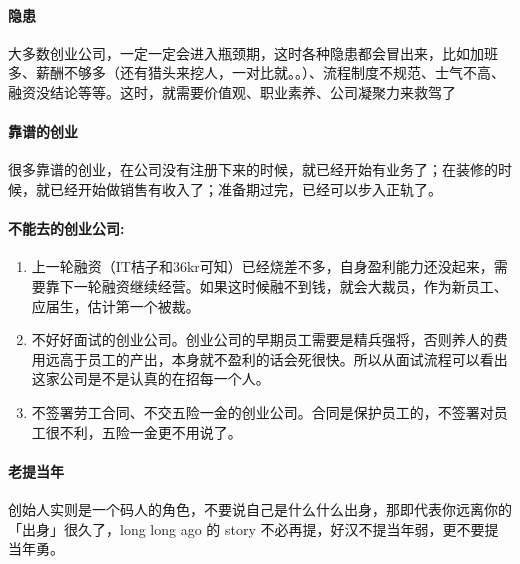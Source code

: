 \documentclass[letterpaper,11pt,english]{sphinxmanual}
\begin{document}
\paragraph{隐患}
\label{\detokenize{chapter_interview/not_go:id4}}
大多数创业公司，一定一定会进入瓶颈期，这时各种隐患都会冒出来，比如加班多、薪酬不够多（还有猎头来挖人，一对比就。。）、流程制度不规范、士气不高、融资没结论等等。这时，就需要价值观、职业素养、公司凝聚力来救驾了


\paragraph{靠谱的创业}
\label{\detokenize{chapter_interview/not_go:id5}}
很多靠谱的创业，在公司没有注册下来的时候，就已经开始有业务了；在装修的时候，就已经开始做销售有收入了；准备期过完，已经可以步入正轨了。
%
\begin{footnote}[811]\sphinxAtStartFootnote
{}
%
\end{footnote}


\paragraph{不能去的创业公司:}
\label{\detokenize{chapter_interview/not_go:id6}}\begin{enumerate}
%
\item {} 
上一轮融资（IT桔子和36kr可知）已经烧差不多，自身盈利能力还没起来，需要靠下一轮融资继续经营。如果这时候融不到钱，就会大裁员，作为新员工、应届生，估计第一个被裁。

\item {} 
不好好面试的创业公司。创业公司的早期员工需要是精兵强将，否则养人的费用远高于员工的产出，本身就不盈利的话会死很快。所以从面试流程可以看出这家公司是不是认真的在招每一个人。

\item {} 
不签署劳工合同、不交五险一金的创业公司。合同是保护员工的，不签署对员工很不利，五险一金更不用说了。

\end{enumerate}


\paragraph{老提当年}
\label{\detokenize{chapter_interview/not_go:id7}}
创始人实则是一个码人的角色，不要说自己是什么什么出身，那即代表你远离你的「出身」很久了，long
long ago 的 story 不必再提，好汉不提当年弱，更不要提当年勇。
\end{document}
